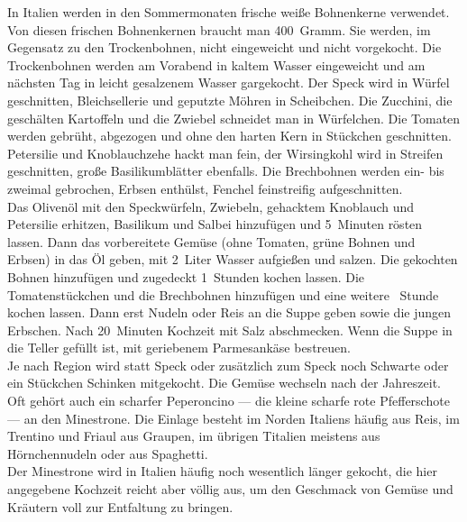       \begin{zubereitung}
        In Italien werden in den Sommermonaten frische weiße Bohnenkerne
	verwendet. Von diesen frischen Bohnenkernen braucht man 400~Gramm. Sie
	werden, im Gegensatz zu den Trockenbohnen, nicht eingeweicht und nicht
	vorgekocht. Die Trockenbohnen werden am Vorabend in kaltem Wasser
	eingeweicht und am nächsten Tag in leicht gesalzenem Wasser gargekocht.
	Der Speck wird in Würfel geschnitten, Bleichsellerie und geputzte
	Möhren in Scheibchen. Die Zucchini, die geschälten Kartoffeln und die
	Zwiebel schneidet man in Würfelchen. Die Tomaten werden gebrüht,
	abgezogen und ohne den harten Kern in Stückchen geschnitten. Petersilie
	und Knoblauchzehe hackt man fein, der Wirsingkohl wird in Streifen
	geschnitten, große Basilikumblätter ebenfalls. Die Brechbohnen werden
	ein- bis zweimal gebrochen, Erbsen enthülst, Fenchel feinstreifig
	aufgeschnitten. \\
	Das Olivenöl mit den Speckwürfeln, Zwiebeln, gehacktem Knoblauch und
	Petersilie erhitzen, Basilikum und Salbei hinzufügen und 5~Minuten
	rösten lassen. Dann das vorbereitete Gemüse (ohne Tomaten, grüne Bohnen
	und Erbsen) in das Öl geben, mit 2\breh{}~Liter Wasser aufgießen und
	salzen. Die gekochten Bohnen hinzufügen und zugedeckt 1\breh{}~Stunden
	kochen lassen. Die Tomatenstückchen und die Brechbohnen hinzufügen und
	eine weitere \breh{}~Stunde kochen lassen. Dann erst Nudeln oder Reis
	an die Suppe geben sowie die jungen Erbschen. Nach 20~Minuten Kochzeit
	mit Salz abschmecken. Wenn die Suppe in die Teller gefüllt ist, mit
	geriebenem Parmesankäse bestreuen. \\
	Je nach Region wird statt Speck oder zusätzlich zum Speck noch Schwarte
	oder ein Stückchen Schinken mitgekocht. Die Gemüse wechseln nach der
	Jahreszeit. Oft gehört auch ein scharfer Peperoncino --- die kleine
	scharfe rote Pfefferschote --- an den Minestrone. Die Einlage besteht
	im Norden Italiens häufig aus Reis, im Trentino und Friaul aus Graupen,
	im übrigen Titalien meistens aus Hörnchennudeln oder aus Spaghetti. \\
	Der Minestrone wird in Italien häufig noch wesentlich länger gekocht,
	die hier angegebene Kochzeit reicht aber völlig aus, um den Geschmack
	von Gemüse und Kräutern voll zur Entfaltung zu bringen. \\
      \end{zubereitung}



